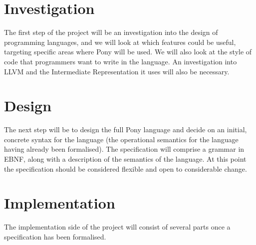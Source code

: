 \documentclass[11pt,a4paper]{report}
\begin{document}
\section{Investigation}
The first step of the project will be an investigation into the design of programming languages, and we will look at which features could be useful, targeting specific areas where Pony will be used.
We will also look at the style of code that programmers want to write in the language.
An investigation into LLVM and the Intermediate Representation it uses will also be necessary.

\section{Design}
The next step will be to design the full Pony language and decide on an initial, concrete syntax for the language (the operational semantics for the language having already been formalised).
The specification will comprise a grammar in EBNF, along with a description of the semantics of the language.
At this point the specification should be considered flexible and open to considerable change.

\section{Implementation}
The implementation side of the project will consist of several parts once a specification has been formalised.
\end{document}
